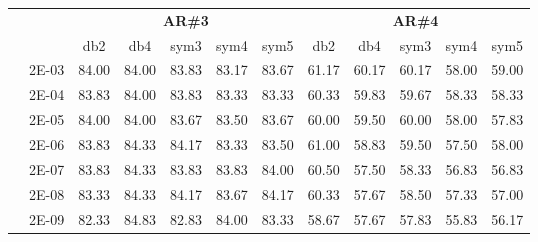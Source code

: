 \begin{table}[H]
\begin{tabular}{|c|c|c c c c c|c c c c c|}
\cline{3-12}
\multicolumn{2}{c}{} & \multicolumn{5}{|c|}{\textbf{AR\#3}}  & \multicolumn{5}{c|}{\textbf{AR\#4}} \\\cline{3-12}
\multicolumn{2}{c}{}  & \multicolumn{1}{|c}{db2} & db4 & sym3 & sym4 & sym5 & db2 & db4& sym3 & sym4 & sym5 \\\hline
\multicolumn{1}{|c|}{ \multirow{6}{*}{\rotatebox[origin=c]{90}{\textbf{Gamma}}} }
&2E-03&	84.00&	84.00&	83.83&	83.17&	83.67&	61.17&	60.17&	60.17&	58.00&	59.00	\\\cline{2-12}
&2E-04&	83.83&	84.00&	83.83&	83.33&	83.33&	60.33&	59.83&	59.67&	58.33&	58.33	\\\cline{2-12}
&2E-05&	84.00&	84.00&	83.67&	83.50&	83.67&	60.00&	59.50&	60.00&	58.00&	57.83	\\\cline{2-12}
&2E-06&	83.83&	84.33&	84.17&	83.33&	83.50&	61.00&	58.83&	59.50&	57.50&	58.00	\\\cline{2-12}
&2E-07&	83.83&	84.33&	83.83&	83.83&	84.00&	60.50&	57.50&	58.33&	56.83&	56.83	\\\cline{2-12}
&2E-08&	83.33&	84.33&	84.17&	83.67&	84.17&	60.33&	57.67&	58.50&	57.33&	57.00	\\\cline{2-12}
&2E-09&	82.33&	84.83&	82.83&	84.00&	83.33&	58.67&	57.67&	57.83&	55.83&	56.17	

	
	
	
\\\midrule
\end{tabular}
\end{table}




